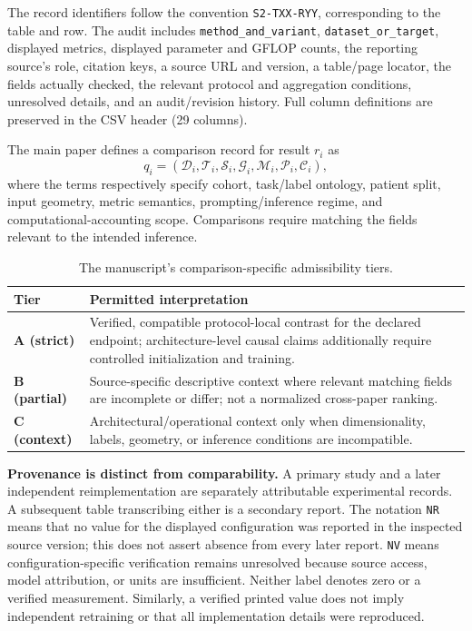 \documentclass[11pt,a4paper]{article}
\newcommand{\ssection}[1]{\vspace{5pt}\noindent{\large\bfseries\color{navy}#1}\par\vspace{3pt}}
\begin{document}
The record identifiers follow the convention \texttt{S2-TXX-RYY}, corresponding to the table and row. The audit includes \texttt{method\_and\_variant}, \texttt{dataset\_or\_target}, displayed metrics, displayed parameter and GFLOP counts, the reporting source's role, citation keys, a source URL and version, a table/page locator, the fields actually checked, the relevant protocol and aggregation conditions, unresolved details, and an audit/revision history. Full column definitions are preserved in the CSV header (29 columns).

\ssection{S4. Evidence interpretation}
The main paper defines a comparison record for result $r_i$ as
\[
q_i=(\mathcal D_i,\mathcal T_i,\mathcal S_i,\mathcal G_i,\mathcal M_i,\mathcal P_i,\mathcal C_i),
\]
where the terms respectively specify cohort, task/label ontology, patient split, input geometry, metric semantics, prompting/inference regime, and computational-accounting scope. Comparisons require matching the fields relevant to the intended inference.

\begin{table}[H]
\centering\footnotesize
\caption{The manuscript's comparison-specific admissibility tiers.}
\begin{tabularx}{\linewidth}{>{\bfseries}p{16mm}X}\toprule
\textbf{Tier} & \textbf{Permitted interpretation}\\\midrule
A (strict) & Verified, compatible protocol-local contrast for the declared endpoint; architecture-level causal claims additionally require controlled initialization and training.\\
B (partial) & Source-specific descriptive context where relevant matching fields are incomplete or differ; not a normalized cross-paper ranking.\\
C (context) & Architectural/operational context only when dimensionality, labels, geometry, or inference conditions are incompatible.\\\bottomrule
\end{tabularx}
\end{table}

\textbf{Provenance is distinct from comparability.} A primary study and a later independent reimplementation are separately attributable experimental records. A subsequent table transcribing either is a secondary report. The notation \texttt{NR} means that no value for the displayed configuration was reported in the inspected source version; this does not assert absence from every later report. \texttt{NV} means configuration-specific verification remains unresolved because source access, model attribution, or units are insufficient. Neither label denotes zero or a verified measurement. Similarly, a verified printed value does not imply independent retraining or that all implementation details were reproduced.
\end{document}
